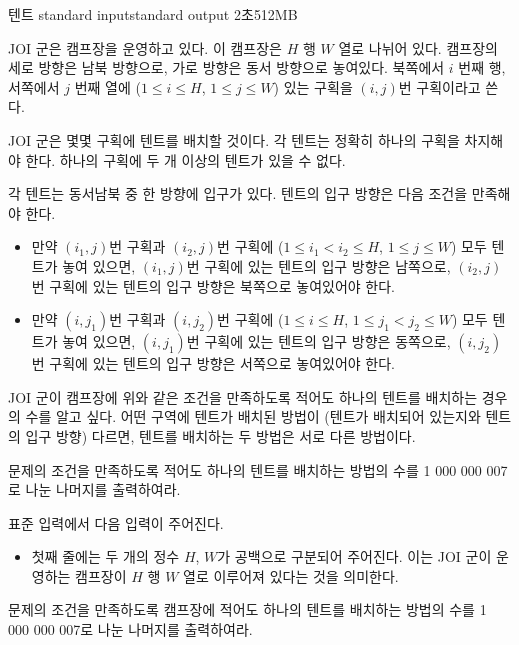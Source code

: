 \begin{problem}{텐트}
	{standard input}{standard output}
	{2초}{512MB}{}
	
	JOI 군은 캠프장을 운영하고 있다. 이 캠프장은 $H$ 행 $W$ 열로 나뉘어 있다. 캠프장의 세로 방향은 남북 방향으로, 가로 방향은 동서 방향으로 놓여있다. 북쪽에서 $i$ 번째 행, 서쪽에서 $j$ 번째 열에 ($1 \le i \le H$, $1 \le j \le W$) 있는 구획을 $(i, j)$번 구획이라고 쓴다.
	
	JOI 군은 몇몇 구획에 텐트를 배치할 것이다. 각 텐트는 정확히 하나의 구획을 차지해야 한다. 하나의 구획에 두 개 이상의 텐트가 있을 수 없다.
	
	각 텐트는 동서남북 중 한 방향에 입구가 있다. 텐트의 입구 방향은 다음 조건을 만족해야 한다.
	
	\begin{itemize}
		\item 만약 $(i_1, j)$번 구획과 $(i_2, j)$번 구획에 ($1 \le i_1 < i_2 \le H$, $1 \le j \le W$) 모두 텐트가 놓여 있으면, $(i_1, j)$번 구획에 있는 텐트의 입구 방향은 남쪽으로, $(i_2, j)$번 구획에 있는 텐트의 입구 방향은 북쪽으로 놓여있어야 한다.
		\item 만약 $(i, j_1)$번 구획과 $(i, j_2)$번 구획에 ($1 \le i \le H$, $1 \le j_1 < j_2 \le W$) 모두 텐트가 놓여 있으면, $(i, j_1)$번 구획에 있는 텐트의 입구 방향은 동쪽으로, $(i, j_2)$번 구획에 있는 텐트의 입구 방향은 서쪽으로 놓여있어야 한다.
	\end{itemize}

	JOI 군이 캠프장에 위와 같은 조건을 만족하도록 적어도 하나의 텐트를 배치하는 경우의 수를 알고 싶다. 어떤 구역에 텐트가 배치된 방법이 (텐트가 배치되어 있는지와 텐트의 입구 방향) 다르면, 텐트를 배치하는 두 방법은 서로 다른 방법이다.
	
	문제의 조건을 만족하도록 적어도 하나의 텐트를 배치하는 방법의 수를 1 000 000 007로 나눈 나머지를 출력하여라.
	
	
	\InputFile
	
	표준 입력에서 다음 입력이 주어진다.
	
	\begin{itemize}
		\item 첫째 줄에는 두 개의 정수 $H$, $W$가 공백으로 구분되어 주어진다. 이는 JOI 군이 운영하는 캠프장이 $H$ 행 $W$ 열로 이루어져 있다는 것을 의미한다.
	\end{itemize}
		
	\OutputFile
	
	문제의 조건을 만족하도록 캠프장에 적어도 하나의 텐트를 배치하는 방법의 수를 1 000 000 007로 나눈 나머지를 출력하여라.
	

\end{problem}
